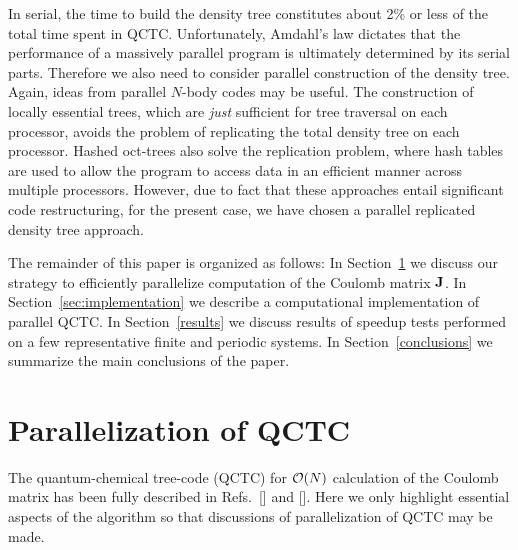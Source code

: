 \commentoutA{\documentclass[prl,aps,twocolumn,twocolumngrid,superbib]{revtex4}}
\begin{document}
In serial, the time to build the density tree constitutes about 2\% or
less of the total time spent in QCTC.  Unfortunately, Amdahl's law
dictates that the performance of a massively parallel program is
ultimately determined by its serial parts.  Therefore we also need to
consider parallel construction of the density tree. Again, ideas from
parallel $N$-body codes may be useful.  The construction of locally
essential trees, which are {\it just} sufficient for tree traversal on
each processor,\cite{MWarren92} avoids the problem of replicating the
total density tree on each processor.  Hashed
oct-trees\cite{MWarren93,MWarren95b} also solve the replication
problem, where hash tables are used to allow the program to access
data in an efficient manner across multiple processors. However, due
to fact that these approaches entail significant code restructuring,
for the present case, we have chosen a parallel replicated density
tree approach.

The remainder of this paper is organized as follows: In
Section~\ref{ParaQCTC} we discuss our strategy to efficiently
parallelize computation of the Coulomb matrix ${\bf J}$. In
Section~\ref{sec:implementation} we describe a computational
implementation of parallel QCTC. In Section~\ref{results} we discuss
results of speedup tests performed on a few representative finite and
periodic systems. In Section~\ref{conclusions} we summarize the main
conclusions of the paper.

\section{Parallelization of QCTC}
\label{ParaQCTC}
The quantum-chemical tree-code (QCTC) for ${\cal O}(N)$ calculation of
the Coulomb matrix has been fully described in
Refs.~[] and [].
Here we only highlight essential aspects of the algorithm so that
discussions of parallelization of QCTC may be made.
\end{document}
